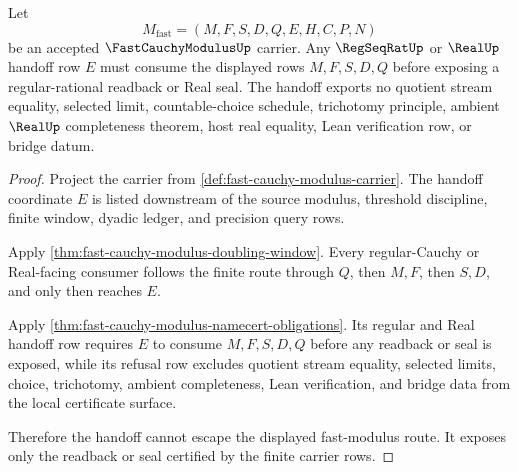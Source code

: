 \begin{theorem}
\label{thm:fast-cauchy-modulus-handoff-nonescape}
Let
$$
M_{\mathrm{fast}}=(M,F,S,D,Q,E,H,C,P,N)
$$
be an accepted $\FastCauchyModulusUp$ carrier. Any $\RegSeqRatUp$ or $\RealUp$ handoff row $E$ must consume the displayed rows $M,F,S,D,Q$ before exposing a regular-rational readback or Real seal. The handoff exports no quotient stream equality, selected limit, countable-choice schedule, trichotomy principle, ambient $\RealUp$ completeness theorem, host real equality, Lean verification row, or bridge datum.
\end{theorem}
\begin{proof}
Project the carrier from \autoref{def:fast-cauchy-modulus-carrier}. The handoff coordinate $E$ is listed downstream of the source modulus, threshold discipline, finite window, dyadic ledger, and precision query rows.

Apply \autoref{thm:fast-cauchy-modulus-doubling-window}. Every regular-Cauchy or Real-facing consumer follows the finite route through $Q$, then $M,F$, then $S,D$, and only then reaches $E$.

Apply \autoref{thm:fast-cauchy-modulus-namecert-obligations}. Its regular and Real handoff row requires $E$ to consume $M,F,S,D,Q$ before any readback or seal is exposed, while its refusal row excludes quotient stream equality, selected limits, choice, trichotomy, ambient completeness, Lean verification, and bridge data from the local certificate surface.

Therefore the handoff cannot escape the displayed fast-modulus route. It exposes only the readback or seal certified by the finite carrier rows.
\end{proof}

